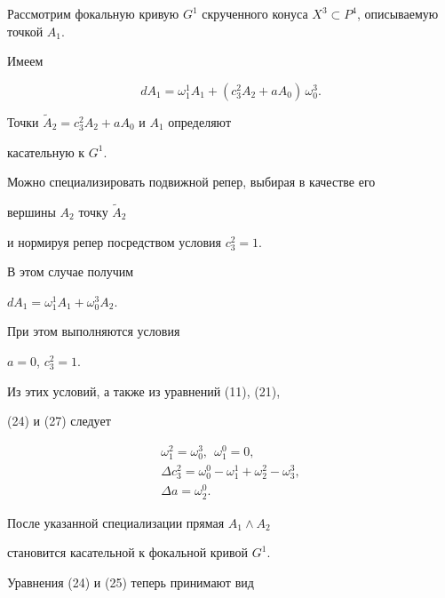 Рассмотрим фокальную кривую $G^1$ скрученного конуса  $X^3 \subset


P^4$, описываемую точкой $A_1$.


Имеем


$$


dA_1 = \omega_1^1 A_1 + (c_3^2 A_2 + a A_0)\, \omega_0^3.


$$


Точки $\widetilde{A}_2 = c_3^2 A_2 + a A_0$ и $A_1$ определяют


касательную к $G^1$.


Можно специализировать подвижной репер, выбирая в качестве его


вершины $A_2$  точку $\widetilde{A}_2 $


и нормируя репер посредством условия $c_3^2 = 1$.


В этом случае получим


$dA_1 = \omega_1^1 A_1 + \omega_0^3 A_2$.


При этом выполняются условия


$a = 0$, $c_3^2 = 1$.


Из этих условий, а также из уравнений (11), (21),


(24) и (27) следует


\begin{gather*}




\omega_1^2 = \omega_0^3, \ \  \omega_1^0 = 0, \\






\Delta c_{3}^2 = \omega_0^0 - \omega_1^1 + \omega_2^2 -\omega_3^3, \\






\Delta a = \omega_2^0.


\end{gather*}


После указанной специализации прямая  $A_1 \wedge A_2$


становится касательной к фокальной кривой  $G^1$.


Уравнения (24) и (25) теперь принимают вид


